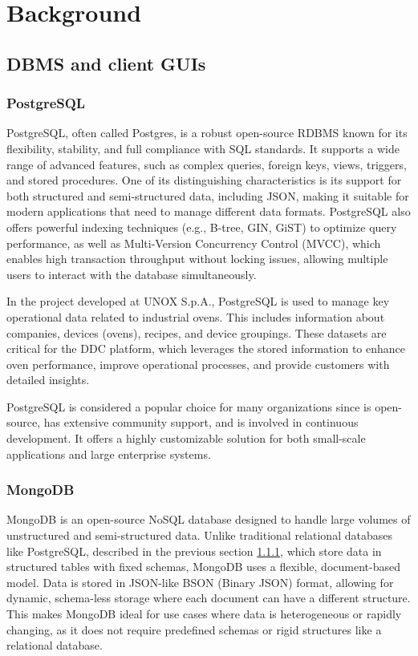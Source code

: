 
\chapter{Background}
\label{chp:background}

\section{DBMS and client GUIs}
\subsection{PostgreSQL}
\label{sec:postgres}
PostgreSQL, often called Postgres, is a robust open-source \ac{RDBMS} known for its flexibility, stability, and full compliance with SQL standards. It supports a wide range of advanced features, such as complex queries, foreign keys, views, triggers, and stored procedures. One of its distinguishing characteristics is its support for both structured and semi-structured data, including \ac{JSON}, making it suitable for modern applications that need to manage different data formats. PostgreSQL also offers powerful indexing techniques (e.g., B-tree, GIN, GiST) to optimize query performance, as well as Multi-Version Concurrency Control (MVCC), which enables high transaction throughput without locking issues, allowing multiple users to interact with the database simultaneously.

In the project developed at UNOX S.p.A., PostgreSQL is used to manage key operational data related to industrial ovens. This includes information about companies, devices (ovens), recipes, and device groupings. These datasets are critical for the \ac{DDC} platform, which leverages the stored information to enhance oven performance, improve operational processes, and provide customers with detailed insights.

PostgreSQL is considered a popular choice for many organizations since is open-source, has extensive community support, and is involved in continuous development. It offers a highly customizable solution for both small-scale applications and large enterprise systems.

\subsection{MongoDB}
MongoDB is an open-source NoSQL database designed to handle large volumes of unstructured and semi-structured data. Unlike traditional relational databases like PostgreSQL, described in the previous section \ref{sec:postgres}, which store data in structured tables with fixed schemas, MongoDB uses a flexible, document-based model. Data is stored in \ac{JSON}-like BSON (Binary \ac{JSON}) format, allowing for dynamic, schema-less storage where each document can have a different structure. This makes MongoDB ideal for use cases where data is heterogeneous or rapidly changing, as it does not require predefined schemas or rigid structures like a relational database.

